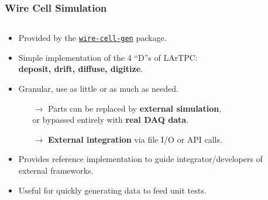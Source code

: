 \begin{frame}

  \frametitle{Wire Cell Simulation}

  \begin{columns}
    \begin{column}{0.75\textwidth}
      \begin{itemize}\footnotesize
      \item Provided by the \href{https://github.com/WireCell/wire-cell-gen}{\texttt{wire-cell-gen}} package.
      \item Simple implementation of the 4 ``D''s of LArTPC:\\
        \textbf{deposit, drift, diffuse, digitize}.
      \item Granular, use as little or as much as needed.
        \begin{itemize}\scriptsize
        \item[$\rightarrow$] Parts can be replaced by \textbf{external
          simulation}, \\or bypassed entirely with \textbf{real DAQ data}.
        \item[$\rightarrow$] \textbf{External integration} via file I/O or API calls.
        \end{itemize}
      \item Provides reference implementation to guide integrator/developers of external frameworks.
      \item Useful for quickly generating data to feed unit tests.
      \end{itemize}
    \end{column}
    \begin{column}{0.25\textwidth}
      \vspace{-10mm}

\end{column}
\end{columns}
\end{frame}
